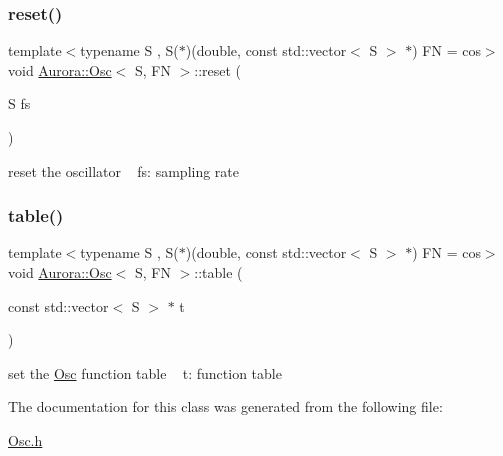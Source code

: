 \subsubsection{\texorpdfstring{reset()}{reset()}}
{\footnotesize\ttfamily template$<$typename S , S($\ast$)(double, const std\+::vector$<$ S $>$ $\ast$) FN = cos$>$ \\
void \hyperlink{class_aurora_1_1_osc}{Aurora\+::\+Osc}$<$ S, FN $>$\+::reset (\begin{DoxyParamCaption}\item[{S}]{fs }\end{DoxyParamCaption})\hspace{0.3cm}{\ttfamily [inline]}}

reset the oscillator ~\newline
fs\+: sampling rate \mbox{\label{class_aurora_1_1_osc_af003fa84004e878179446ceaf2d0007c}} 
\subsubsection{\texorpdfstring{table()}{table()}}
{\footnotesize\ttfamily template$<$typename S , S($\ast$)(double, const std\+::vector$<$ S $>$ $\ast$) FN = cos$>$ \\
void \hyperlink{class_aurora_1_1_osc}{Aurora\+::\+Osc}$<$ S, FN $>$\+::table (\begin{DoxyParamCaption}\item[{const std\+::vector$<$ S $>$ $\ast$}]{t }\end{DoxyParamCaption})\hspace{0.3cm}{\ttfamily [inline]}}

set the \hyperlink{class_aurora_1_1_osc}{Osc} function table ~\newline
t\+: function table 

The documentation for this class was generated from the following file\+:\begin{DoxyCompactItemize}
\item 
\hyperlink{_osc_8h}{Osc.\+h}\end{DoxyCompactItemize}
